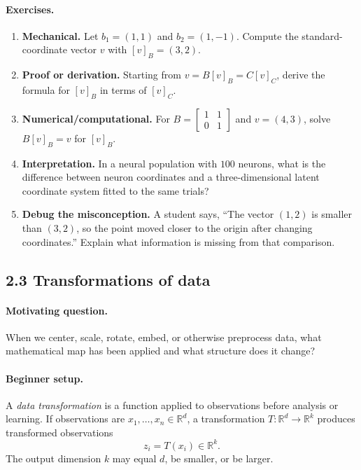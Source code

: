 \paragraph{Exercises.}
\begin{enumerate}[label=\textbf{2.2.\arabic*.}, leftmargin=*]
\item \textbf{Mechanical.} Let \(b_1=(1,1)\) and \(b_2=(1,-1)\). Compute the standard-coordinate vector \(v\) with \([v]_B=(3,2)\).
\item \textbf{Proof or derivation.} Starting from \(v=B[v]_B=C[v]_C\), derive the formula for \([v]_B\) in terms of \([v]_C\).
\item \textbf{Numerical/computational.} For \(B=\begin{bmatrix}1&1\\0&1\end{bmatrix}\) and \(v=(4,3)\), solve \(B[v]_B=v\) for \([v]_B\).
\item \textbf{Interpretation.} In a neural population with \(100\) neurons, what is the difference between neuron coordinates and a three-dimensional latent coordinate system fitted to the same trials?
\item \textbf{Debug the misconception.} A student says, ``The vector \((1,2)\) is smaller than \((3,2)\), so the point moved closer to the origin after changing coordinates.'' Explain what information is missing from that comparison.
\end{enumerate}

\subsection{2.3 Transformations of data}

\paragraph{Motivating question.}
When we center, scale, rotate, embed, or otherwise preprocess data, what mathematical map has been applied and what structure does it change?

\paragraph{Beginner setup.}
A \emph{data transformation} is a function applied to observations before analysis or learning. If observations are \(x_1,\dots,x_n\in\mathbb{R}^d\), a transformation \(T:\mathbb{R}^d\to\mathbb{R}^k\) produces transformed observations
\[
z_i=T(x_i)\in\mathbb{R}^k.
\]
The output dimension \(k\) may equal \(d\), be smaller, or be larger.


